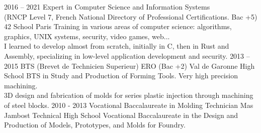 \documentclass[8pt]{developercv} %
\begin{document}
\begin{entrylist}
	\entry
		{2016 -- 2021}
		{Expert in Computer Science and Information Systems\\\footnotesize{(RNCP Level 7, French National Directory of Professional Certifications. Bac +5)}}
		{42 School Paris}
		{
			Training in various areas of computer science: algorithms, graphics, UNIX systems, security, video games, web...\\
			I learned to develop almost from scratch, initially in C, then in Rust and Assembly, specializing in low-level application development and security.
		}
	\entry
		{2013 -- 2015}
		{BTS (Brevet de Technicien Superieur) ERO \footnotesize{(Bac +2)}}
		{Val de Garonne High School}
		{
			BTS in Study and Production of Forming Tools. Very high precision machining.\\
			3D design and fabrication of molds for series plastic injection through machining of steel blocks.
		}
	\entry
		{2010 - 2013}
		{Vocational Baccalaureate in Molding Technician}
		{Mas Jambost Technical High School}
		{
			Vocational Baccalaureate in the Design and Production of Models, Prototypes, and Molds for Foundry.
		}
\end{entrylist}
\end{document}
